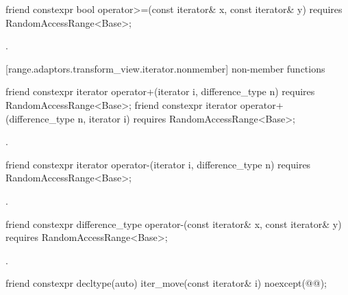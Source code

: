 %
\begin{itemdecl}
friend constexpr bool operator>=(const iterator& x, const iterator& y)
  requires RandomAccessRange<Base>;
\end{itemdecl}

\begin{itemdescr}
\pnum
\returns {}.
\end{itemdescr}

[range.adaptors.transform_view.iterator.nonmember]{ non-member functions}

\begin{itemdecl}
friend constexpr iterator operator+(iterator i, difference_type n)
  requires RandomAccessRange<Base>;
friend constexpr iterator operator+(difference_type n, iterator i)
  requires RandomAccessRange<Base>;
\end{itemdecl}

\begin{itemdescr}
\pnum
\returns {}.
\end{itemdescr}

%
\begin{itemdecl}
friend constexpr iterator operator-(iterator i, difference_type n)
  requires RandomAccessRange<Base>;
\end{itemdecl}

\begin{itemdescr}
\pnum
\returns {}.
\end{itemdescr}

%
\begin{itemdecl}
friend constexpr difference_type operator-(const iterator& x, const iterator& y)
  requires RandomAccessRange<Base>;
\end{itemdecl}

\begin{itemdescr}
\pnum
\returns {}.
\end{itemdescr}

\begin{itemdecl}
friend constexpr decltype(auto) iter_move(const iterator& i)
  noexcept(@\oldtxt{\seebelow}@);
\end{itemdecl}

